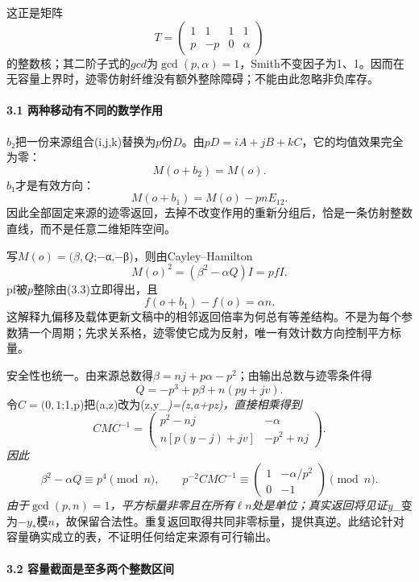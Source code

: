 \documentclass[11pt,a4paper]{article}
\theoremstyle{definition}
\numberwithin{equation}{section}
\begin{document}
{这正是矩阵} \[
T=\begin{pmatrix}1&1&1&1\\p&-p&0&\alpha\end{pmatrix}
\] {的整数核；其二阶子式的\ensuremath{gcd}为\ensuremath{\operatorname{gcd}(p,\alpha )=1}，Smith不变因子为1、1。因而在无容量上界时，迹零仿射纤维没有额外整除障碍；不能由此忽略非负库存。}

\paragraph*{\texorpdfstring{{3.1} {两种移动有不同的数学作用}}{3.1 两种移动有不同的数学作用}}\label{C10-h76}

{\ensuremath{b}₂把一份来源组合(i,j,k)替换为\ensuremath{p}份\ensuremath{D}。由\ensuremath{pD=iA+jB+kC}，它的均值效果完全为零：} \[
M(o+b_2)=M(o).
\tag{C10.3.5}
\] {\ensuremath{b}₁才是有效方向：} \[
M(o+b_1)=M(o)-pnE_{12}.
\tag{C10.3.6}
\] {因此全部固定来源的迹零返回，去掉不改变作用的重新分组后，恰是一条仿射整数直线，而不是任意二维矩阵空间。}

{写\ensuremath{M(o)=(\beta ,Q};−α,−β)，则由Cayley--Hamilton} \[
M(o)^2=(\beta^2-\alpha Q)I=p f I.
\] {pf被\ensuremath{p}整除由(3.3)立即得出，且} \[
\boxed{f(o+b_1)-f(o)=\alpha n.}
\tag{C10.3.7}
\] {这解释九偏移及载体更新文稿中的相邻返回倍率为何总有等差结构。不是为每个参数猜一个周期；先求关系格，迹零使它成为反射，唯一有效计数方向控制平方标量。}

{安全性也统一。由来源总数得\ensuremath{\beta =nj+p\alpha -p^{2}}；由输出总数与迹零条件得} \[
Q=-p^3+p\beta+n(py+jv).
\] {令\ensuremath{C=(0,1};1,p)把(a,z)改为(z,y\_}\emph{{)=(z,a+pz)，直接相乘得到} \[
CMC^{-1}=\begin{pmatrix}
p^2-nj&-\alpha\\
n[p(y-j)+jv]&-p^2+nj
\end{pmatrix}.
\] {因此} \[
\boxed{\beta^2-\alpha Q\equiv p^4\pmod n,\qquad
p^{-2}CMC^{-1}\equiv
\begin{pmatrix}1&-\alpha/p^2\\0&-1\end{pmatrix}\pmod n.}
\tag{C10.3.8}
\] {由于\ensuremath{\operatorname{gcd}(p,n)=1}，平方标量非零且在所有\ensuremath{\ell}\textbar{}\ensuremath{n}处是单位；真实返回将见证y\_}}{变为−\ensuremath{y_*}模\ensuremath{n}，故保留合法性。重复返回取得共同非零标量，提供真逆。此结论针对容量确实成立的表，不证明任何给定来源有可行输出。}

\paragraph*{\texorpdfstring{{3.2} {容量截面是至多两个整数区间}}{3.2 容量截面是至多两个整数区间}}\label{C10-h77}
\end{document}
